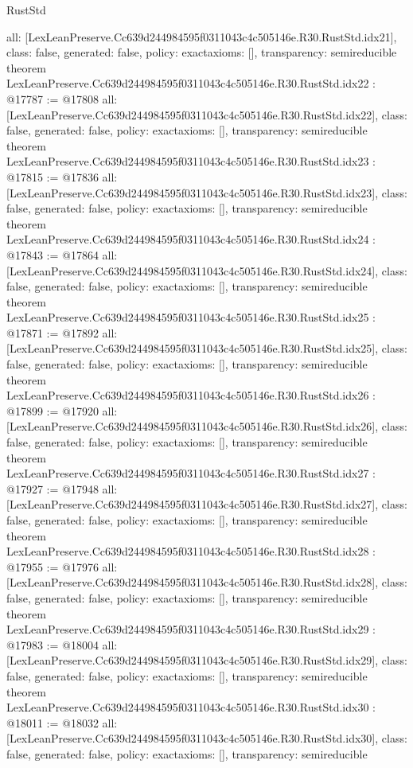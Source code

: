 \begin{lexlean}{RustStd}
\begin{coremodule}
{  all: [LexLeanPreserve.Cc639d244984595f0311043c4c505146e.R30.RustStd.idx21],
  class: false,
  generated: false,
  policy: exact{axioms: []},
  transparency: semireducible
}
theorem LexLeanPreserve.Cc639d244984595f0311043c4c505146e.R30.RustStd.idx22 : @17787 := @17808 {
  all: [LexLeanPreserve.Cc639d244984595f0311043c4c505146e.R30.RustStd.idx22],
  class: false,
  generated: false,
  policy: exact{axioms: []},
  transparency: semireducible
}
theorem LexLeanPreserve.Cc639d244984595f0311043c4c505146e.R30.RustStd.idx23 : @17815 := @17836 {
  all: [LexLeanPreserve.Cc639d244984595f0311043c4c505146e.R30.RustStd.idx23],
  class: false,
  generated: false,
  policy: exact{axioms: []},
  transparency: semireducible
}
theorem LexLeanPreserve.Cc639d244984595f0311043c4c505146e.R30.RustStd.idx24 : @17843 := @17864 {
  all: [LexLeanPreserve.Cc639d244984595f0311043c4c505146e.R30.RustStd.idx24],
  class: false,
  generated: false,
  policy: exact{axioms: []},
  transparency: semireducible
}
theorem LexLeanPreserve.Cc639d244984595f0311043c4c505146e.R30.RustStd.idx25 : @17871 := @17892 {
  all: [LexLeanPreserve.Cc639d244984595f0311043c4c505146e.R30.RustStd.idx25],
  class: false,
  generated: false,
  policy: exact{axioms: []},
  transparency: semireducible
}
theorem LexLeanPreserve.Cc639d244984595f0311043c4c505146e.R30.RustStd.idx26 : @17899 := @17920 {
  all: [LexLeanPreserve.Cc639d244984595f0311043c4c505146e.R30.RustStd.idx26],
  class: false,
  generated: false,
  policy: exact{axioms: []},
  transparency: semireducible
}
theorem LexLeanPreserve.Cc639d244984595f0311043c4c505146e.R30.RustStd.idx27 : @17927 := @17948 {
  all: [LexLeanPreserve.Cc639d244984595f0311043c4c505146e.R30.RustStd.idx27],
  class: false,
  generated: false,
  policy: exact{axioms: []},
  transparency: semireducible
}
theorem LexLeanPreserve.Cc639d244984595f0311043c4c505146e.R30.RustStd.idx28 : @17955 := @17976 {
  all: [LexLeanPreserve.Cc639d244984595f0311043c4c505146e.R30.RustStd.idx28],
  class: false,
  generated: false,
  policy: exact{axioms: []},
  transparency: semireducible
}
theorem LexLeanPreserve.Cc639d244984595f0311043c4c505146e.R30.RustStd.idx29 : @17983 := @18004 {
  all: [LexLeanPreserve.Cc639d244984595f0311043c4c505146e.R30.RustStd.idx29],
  class: false,
  generated: false,
  policy: exact{axioms: []},
  transparency: semireducible
}
theorem LexLeanPreserve.Cc639d244984595f0311043c4c505146e.R30.RustStd.idx30 : @18011 := @18032 {
  all: [LexLeanPreserve.Cc639d244984595f0311043c4c505146e.R30.RustStd.idx30],
  class: false,
  generated: false,
  policy: exact{axioms: []},
  transparency: semireducible
}
\end{coremodule}
\end{lexlean}
